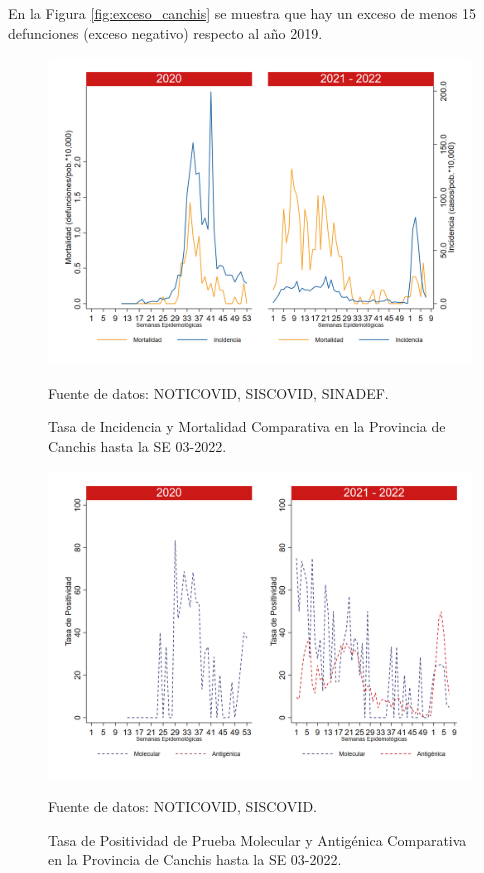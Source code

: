 \documentclass[12pt,a4paper,openany]{book}
\begin{document}
		En la Figura \ref{fig:exceso_canchis} se muestra que hay un exceso de menos 15 defunciones (exceso negativo) respecto al año 2019.
		
		\begin{figure}[h]
			\caption{Tasa de Incidencia y Mortalidad Comparativa en la Provincia de Canchis hasta la SE 03-2022.}\label{fig:inc_mort_canchis}
			\begin{center}
				\includegraphics[width=0.7\linewidth]{../figuras/incidencia_mortalidad_20_21_5.png}
			\end{center}
			{\footnotesize {Fuente de datos: NOTICOVID, SISCOVID, SINADEF.}}
		\end{figure}
		
		\begin{figure}[h]
			\caption{Tasa de Positividad de Prueba Molecular y Antigénica Comparativa en la Provincia de Canchis hasta la SE 03-2022.}\label{fig:positividad_canchis}
			\begin{center}
				\includegraphics[width=0.7\linewidth]{../figuras/positividad_20_21_5.png}
			\end{center}
			{\footnotesize {Fuente de datos: NOTICOVID, SISCOVID.}}
		\end{figure}
		
\end{document}
